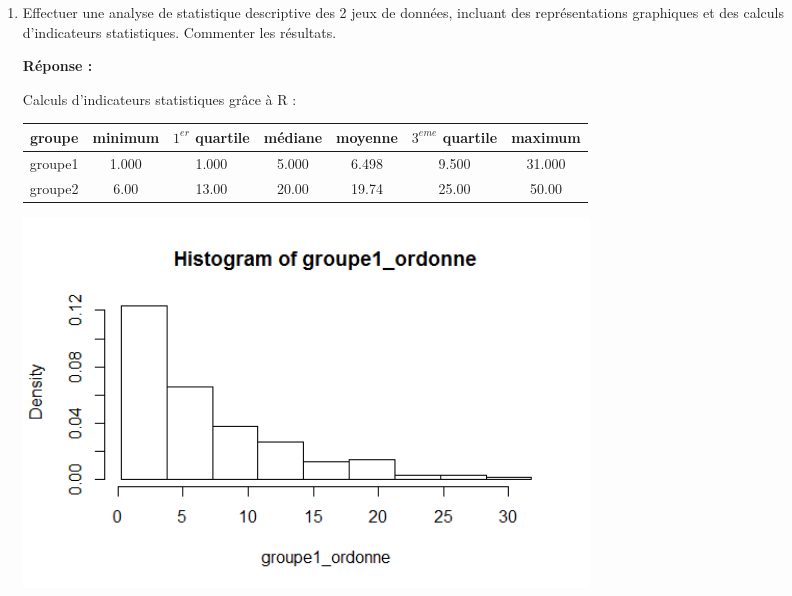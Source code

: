 \documentclass[12pt]{article}
\begin{document}
\begin{enumerate}

\renewcommand{\labelenumi}{\arabic{section}.\arabic{enumi}.}

\item Effectuer une analyse de statistique descriptive des 2 jeux de données, incluant des représentations graphiques et des calculs d'indicateurs statistiques. Commenter les résultats.

\textbf{Réponse : \\}

Calculs d'indicateurs statistiques grâce à R : \\

\begin{tabular}{|c|c|c |c |c |c |c|}

	\hline
	groupe &minimum & $1^{er}$ quartile & médiane & moyenne & $3^{eme}$ quartile & maximum \tabularnewline
	\hline
	groupe1 & 1.000 & 1.000& 5.000& 6.498 & 9.500 & 31.000 \tabularnewline
	\hline
	groupe2 & 6.00 & 13.00 & 20.00 & 19.74 & 25.00 & 50.00 \tabularnewline
	\hline
\end{tabular}

\vspace{1cm}


\begin{center}
\includegraphics[width = 15cm]{graphics/q2_1-groupe1.png}
\label{fig2}
\end{center}




\end{enumerate}
\end{document}
